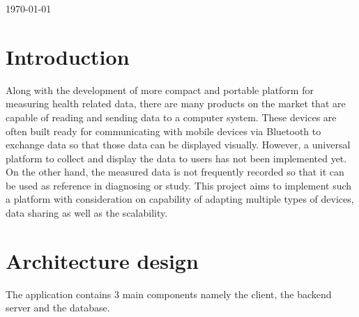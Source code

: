 \begin{titlepage}


{\large \today}\\[2cm] %



\vfill %

\end{titlepage}

\section{Introduction}
Along with the development of more compact and portable platform for measuring health related data, there are many
products on the market that are capable of reading and sending data to a computer system. These devices are often built
ready for communicating with mobile devices via Bluetooth to exchange data so that those data can be displayed visually.
However, a universal platform to collect and display the data to users has not been implemented yet. On the other hand,
the measured data is not frequently recorded so that it can be used as reference in diagnosing or study.  This project
aims to implement such a platform with consideration on capability of adapting multiple types of devices, data sharing
as well as the scalability.

\section{Architecture design}
\label{sec:Architecture design}
The application contains 3 main components namely the client, the backend server and the database.

